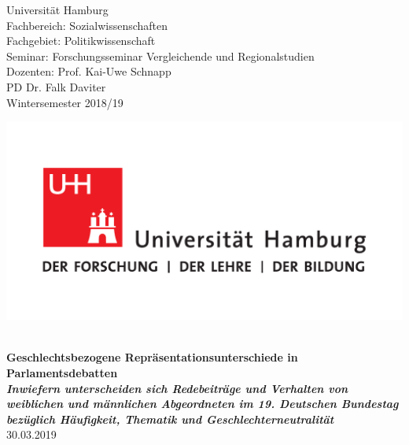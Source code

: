 \documentclass[12pt, 
    twoside=false, 
    bibliography=totoc, 
    numbers=endperiod, 
    headings=normal, 
    toc=chapterentrydotfill
    ]{scrbook}
\begin{document}
\begin{titlepage}
    \begin{minipage}[t]{0.6\textwidth}
    \flushleft 
    Universität Hamburg \\
    Fachbereich: Sozialwissenschaften \\
    Fachgebiet: Politikwissenschaft \\
    Seminar: Forschungsseminar Vergleichende und Regionalstudien \\ 
    Dozenten: Prof. Kai-Uwe Schnapp \\
    PD Dr. Falk Daviter \\
    Wintersemester 2018/19 \\
    \end{minipage}
    \hfill
    \begin{minipage}[t][1.7cm][b]{0.35\textwidth}
    \includegraphics[width=\textwidth]{images/UHH-Logo_2010_Farbe_CMYK.pdf}
    \end{minipage}
    
    \vspace*{\fill}
    \begin{center}
	\vspace{1cm} \vspace{0.2cm} \\
	\textbf{\Large Geschlechtsbezogene Repräsentationsunterschiede in Parlamentsdebatten \\
	\vspace {0,5cm} \small\emph{Inwiefern unterscheiden sich Redebeiträge und Verhalten von weiblichen und männlichen Abgeordneten im 19. Deutschen Bundestag bezüglich Häufigkeit, Thematik und Geschlechterneutralität}} \\
	\vspace{0.5cm}
	30.03.2019
	\end{center}
    \vspace*{\fill}
	

\end{titlepage}
\end{document}
